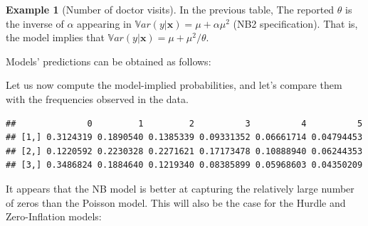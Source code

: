 \documentclass[
  12pt,
]{book}
\newenvironment{Shaded}{\begin{snugshade}}{\end{snugshade}}
\newcommand{\AttributeTok}[1]{\textcolor[rgb]{0.13,0.29,0.53}{#1}}
\newcommand{\CommentTok}[1]{\textcolor[rgb]{0.56,0.35,0.01}{\textit{#1}}}
\newcommand{\DecValTok}[1]{\textcolor[rgb]{0.00,0.00,0.81}{#1}}
\newcommand{\FunctionTok}[1]{\textcolor[rgb]{0.13,0.29,0.53}{\textbf{#1}}}
\newcommand{\NormalTok}[1]{#1}
\newcommand{\OtherTok}[1]{\textcolor[rgb]{0.56,0.35,0.01}{#1}}
\newcommand{\SpecialCharTok}[1]{\textcolor[rgb]{0.81,0.36,0.00}{\textbf{#1}}}
\newcommand{\StringTok}[1]{\textcolor[rgb]{0.31,0.60,0.02}{#1}}
\theoremstyle{definition}
\theoremstyle{definition}
\newtheorem{example}{Example}[chapter]
\theoremstyle{definition}
\theoremstyle{definition}
\theoremstyle{remark}
\begin{document}
\begin{example}[Number of doctor visits]
In the previous table, The reported \(\theta\) is the inverse of \(\alpha\) appearing in \(\mathbb{V}ar(y|\mathbf{x}) = \mu+\alpha \mu^2\) (NB2 specification). That is, the model implies that \(\mathbb{V}ar(y|\mathbf{x}) = \mu+\mu^2/\theta\).

Models' predictions can be obtained as follows:

\begin{Shaded}
\end{Shaded}

Let us now compute the model-implied probabilities, and let's compare them with the frequencies observed in the data.

\begin{Shaded}
\end{Shaded}

\begin{verbatim}
##              0         1         2          3          4          5
## [1,] 0.3124319 0.1890540 0.1385339 0.09331352 0.06661714 0.04794453
## [2,] 0.1220592 0.2230328 0.2271621 0.17173478 0.10888940 0.06244353
## [3,] 0.3486824 0.1884640 0.1219340 0.08385899 0.05968603 0.04350209
\end{verbatim}

It appears that the NB model is better at capturing the relatively large number of zeros than the Poisson model. This will also be the case for the Hurdle and Zero-Inflation models:
\end{example}
\end{document}
